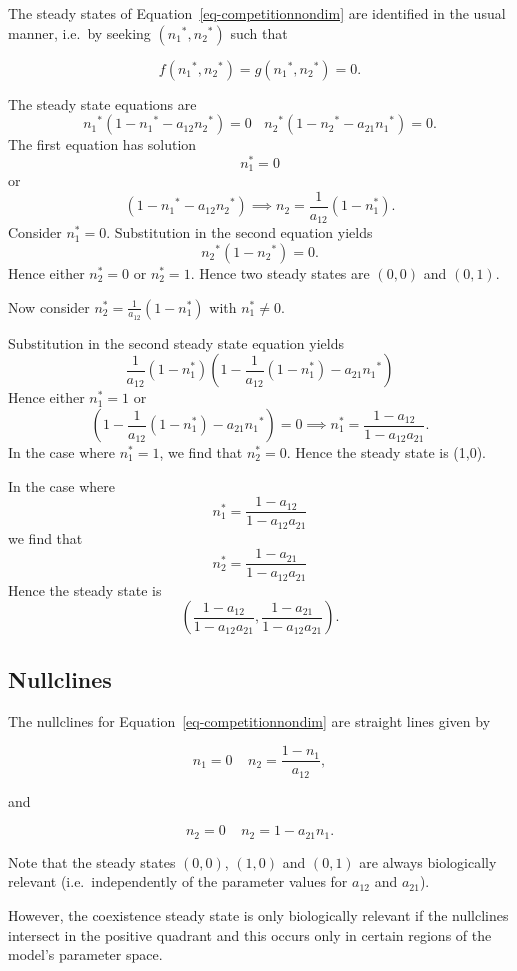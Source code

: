 \documentclass[
  letterpaper,
  DIV=11,
  numbers=noendperiod]{scrreprt}
\begin{document}
The steady states of Equation~\ref{eq-competitionnondim} are identified
in the usual manner, i.e.~by seeking \(({n_1}^*,{n_2}^*)\) such that

\[
f({n_1}^*,{n_2}^*)=g({n_1}^*,{n_2}^*)=0.
\]

The steady state equations are \[
 {n_1}^*\left(1- {n_1}^*-a_{12}{n_2}^*\right)=0 \ \ \ \ {n_2}^*\left(1-{n_2}^*-a_{21}{n_1}^*\right)=0.
\] The first equation has solution \[
n_1^*=0
\] or \[
\left(1- {n_1}^*-a_{12}{n_2}^*\right) \implies n_2=\frac{1}{a_{12}}(1-n_1^*).
\] Consider \(n_1^*=0\). Substitution in the second equation yields \[
 {n_2}^*\left(1-{n_2}^*\right)=0.
 \] Hence either \(n_2^*=0\) or \(n_2^*=1\). Hence two steady states are
\((0,0)\) and \((0,1).\)

Now consider \(n_2^*=\frac{1}{a_{12}}(1-n_1^*)\) with \(n_1^*\neq0\).

Substitution in the second steady state equation yields \[
\frac{1}{a_{12}}(1-n_1^*) \left(1- \frac{1}{a_{12}}(1-n_1^*) -a_{21}{n_1}^*\right)
\] Hence either \(n_1^*=1\) or \[
\left(1- \frac{1}{a_{12}}(1-n_1^*) -a_{21}{n_1}^*\right)=0 \implies n_1^*=\frac{1-a_{12}}{1-a_{12}a_{21}}.
\] In the case where \(n_1^*=1\), we find that \(n_2^*=0\). Hence the
steady state is (1,0).

In the case where \[
n_1^*=\frac{1-a_{12}}{1-a_{12}a_{21}}
\] we find that \[
n_2^*=\frac{1-a_{21}}{1-a_{12}a_{21}}
\] Hence the steady state is \[
\left(\frac{1-a_{12}}{1-a_{12}a_{21}},\frac{1-a_{21}}{1-a_{12}a_{21}}\right).
\]

\subsection{Nullclines}\label{nullclines-1}

The nullclines for Equation~\ref{eq-competitionnondim} are straight
lines given by

\[
 n_1=0 \ \ \ \ \ n_2=\frac{1-n_1}{a_{12}}, 
\]

and

\[ 
 n_2=0 \ \  \ \  \ n_2= 1-a_{21}n_1.
\]

Note that the steady states \((0,0)\), \((1,0)\) and \((0,1)\) are
always biologically relevant (i.e.~independently of the parameter values
for \(a_{12}\) and \(a_{21}\)).

However, the coexistence steady state is only biologically relevant if
the nullclines intersect in the positive quadrant and this occurs only
in certain regions of the model's parameter space.
\end{document}

